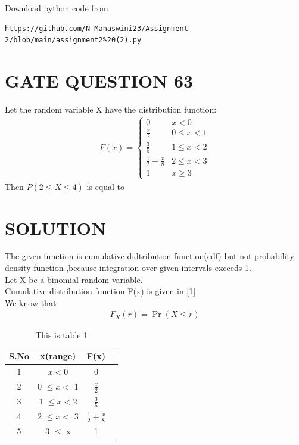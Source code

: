 \documentclass[journal,12pt,twocolumn]{IEEEtran}
\begin{document}
\renewcommand{\thefigure}{\theenumi}
\renewcommand{\thetable}{\theenumi}
Download python code from 
\begin{lstlisting}
https://github.com/N-Manaswini23/Assignment-2/blob/main/assignment2%20(2).py
\end{lstlisting}
%

\section*{GATE QUESTION 63}
Let the random variable X have the distribution function:
\begin{align}
F(x) = \begin{cases}
0 & x < 0
\\
\frac{x}{2} & 0 \leq x < 1 
\\
\frac{3}{5} & 1 \leq x < 2
\\
\frac{1}{2}+\frac{x}{8} & 2 \leq x < 3
\\
1 & x \geq 3
\end{cases} \label{1}
\end{align}
Then $P (2 \leq X \leq 4)$ is equal to


\section*{SOLUTION}
The given function is cumulative didtribution function(cdf) but not probability density function ,because integration over given intervals exceeds 1.\\
Let X be a binomial random variable. \\
Cumulative distribution function F(x) is given in \eqref{1}\\
We know that
\begin{align}
F_X(r) = \Pr (X \leq r) 
\end{align}

\begin{table}[h!]
\resizebox{7cm}{!}
{ 
\begin{tabular}{|c|c|c|c|}
\hline
S.No & x(range) & F(x) \\
\hline
1 & $x < 0$ & 0 \\
\hline
2 & 0 $\leq x < $ 1 & $\frac{x}{2}$\\
\hline
3 & 1 $\leq  x < $2 & $\frac{3}{5}$\\
\hline
4 & 2 $\leq x  < $ 3 & $\frac{1}{2}+\frac{x}{8}$  \\
\hline
5 & 3 $\leq$ x & 1\\
\hline
\end{tabular} 
}
\caption{This is table 1}
\label{table:1}
\end{table}
\end{document}
